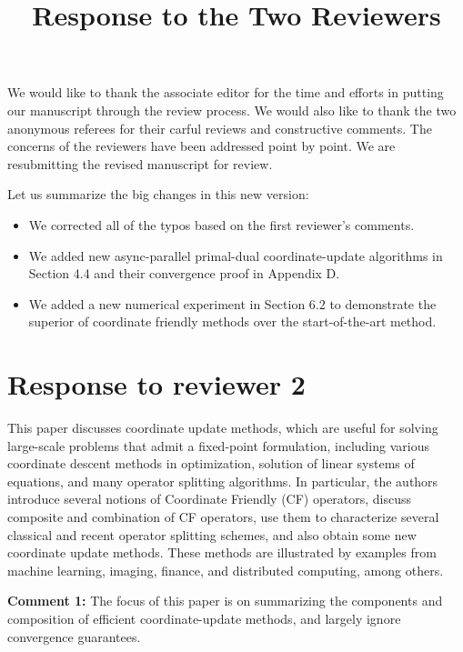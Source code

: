 \documentclass[amsa]{ipart}
\begin{document}
\title{Response to the Two Reviewers}
\vspace{5mm}

We would like to thank the associate editor for the time and efforts in putting our manuscript through the review process. We would also like to thank the two anonymous referees for their carful reviews and constructive comments. The concerns of the reviewers have been addressed point by point. We are resubmitting the revised manuscript for review. 

Let us summarize the big changes in this new version:
\begin{itemize}
\item We corrected all of the typos based on the first reviewer's comments. 
\item We added new async-parallel primal-dual coordinate-update algorithms in Section 4.4 and their convergence proof in Appendix D.
\item We added a new numerical experiment in Section 6.2 to demonstrate the superior of coordinate friendly methods over the start-of-the-art method. 
\end{itemize}
\section{Response to reviewer 2}
This paper discusses coordinate update methods, which are useful for solving
large-scale problems that admit a fixed-point formulation, including various
coordinate descent methods in optimization, solution of linear systems of
equations, and many operator splitting algorithms. In particular, the authors
introduce several notions of Coordinate Friendly (CF) operators, discuss
composite and combination of CF operators, use them to characterize several
classical and recent operator splitting schemes, and also obtain some new
coordinate update methods. These methods are illustrated by examples from
machine learning, imaging, finance, and distributed computing, among others.

\textbf{Comment 1:} The focus of this paper is on summarizing the components and composition of
efficient coordinate-update methods, and largely ignore convergence guarantees.
\end{document}
